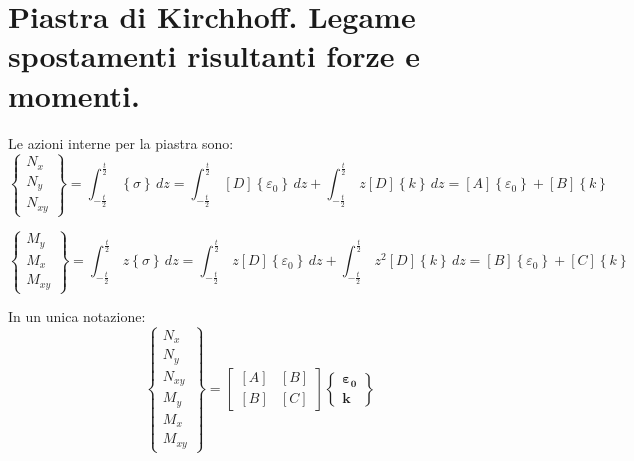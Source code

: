 \section{Piastra di Kirchhoff. Legame spostamenti risultanti forze e momenti.}

Le azioni interne per la piastra sono:
\begin{equation*}
    \left\{
\begin{array}{c}
N_x \\
N_y\\
N_{xy}
\end{array}
\right\} = \int_{-\frac{t}{2}}^{\frac{t}{2}}\,  \left\{\sigma\right\} \,dz
=  \int_{-\frac{t}{2}}^{\frac{t}{2}}\, [D] \left\{\varepsilon_0\right\} \,dz
 +\int_{-\frac{t}{2}}^{\frac{t}{2}}\,z [D] \left\{k\right\} \,dz
 =[A]   \left\{\varepsilon_0\right\}  +[B] \left\{k\right\}
\end{equation*}

\begin{equation*}
    \left\{
\begin{array}{c}
M_y \\
M_x\\
M_{xy}
\end{array}
\right\} = \int_{-\frac{t}{2}}^{\frac{t}{2}}\,  z\left\{\sigma\right\} \,dz
=  \int_{-\frac{t}{2}}^{\frac{t}{2}}\, z[D] \left\{\varepsilon_0\right\} \,dz
 +\int_{-\frac{t}{2}}^{\frac{t}{2}}\,z^2 [D] \left\{k\right\} \,dz
 =[B]   \left\{\varepsilon_0\right\}  +[C] \left\{k\right\}
\end{equation*}

In un unica notazione:
\begin{equation*}
\left\{
\begin{array}{c}
N_x \\
N_y\\
N_{xy}\\
M_y \\
M_x\\
M_{xy}
\end{array}
\right\}
=
\begin{bmatrix}
[A] & [B] \\
[B] & [C]
\end{bmatrix}
\left\{
\begin{array}{c}
\boldsymbol{\varepsilon_0}\\
\boldsymbol{k}
\end{array}
\right\}
\end{equation*}

